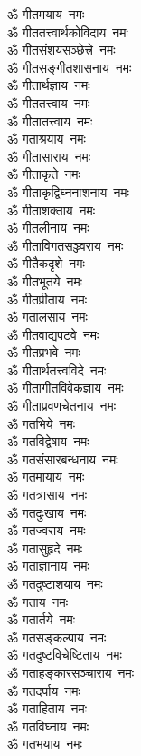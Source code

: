 \begin{multicols}{2}
\begin{flushleft}
ॐ गीतमयाय~नमः\\
ॐ गीततत्त्वार्थकोविदाय~नमः\\
ॐ गीतसंशयसञ्छेत्त्रे~नमः\\
ॐ गीतसङ्गीतशासनाय~नमः\\
ॐ गीतार्थज्ञाय~नमः\\
ॐ गीततत्त्वाय~नमः\\
ॐ गीतातत्त्वाय~नमः\hfill{}\\
ॐ गताश्रयाय~नमः\\
ॐ गीतासाराय~नमः\\
ॐ गीताकृते~नमः\\
ॐ गीताकृद्विघ्ननाशनाय~नमः\\
ॐ गीताशक्ताय~नमः\\
ॐ गीतलीनाय~नमः\\
ॐ गीताविगतसञ्ज्वराय~नमः\\
ॐ गीतैकदृशे~नमः\\
ॐ गीतभूतये~नमः\\
ॐ गीतप्रीताय~नमः\hfill{}\\
ॐ गतालसाय~नमः\\
ॐ गीतवाद्यपटवे~नमः\\
ॐ गीतप्रभवे~नमः\\
ॐ गीतार्थतत्त्वविदे~नमः\\
ॐ गीतागीतविवेकज्ञाय~नमः\\
ॐ गीताप्रवणचेतनाय~नमः\\
ॐ गतभिये~नमः\\
ॐ गतविद्वेषाय~नमः\\
ॐ गतसंसारबन्धनाय~नमः\\
ॐ गतमायाय~नमः\hfill{}\\
ॐ गतत्रासाय~नमः\\
ॐ गतदुःखाय~नमः\\
ॐ गतज्वराय~नमः\\
ॐ गतासुहृदे~नमः\\
ॐ गताज्ञानाय~नमः\\
ॐ गतदुष्टाशयाय~नमः\\
ॐ गताय~नमः\\
ॐ गतार्तये~नमः\\
ॐ गतसङ्कल्पाय~नमः\\
ॐ गतदुष्टविचेष्टिताय~नमः\hfill{}\\
ॐ गताहङ्कारसञ्चाराय~नमः\\
ॐ गतदर्पाय~नमः\\
ॐ गताहिताय~नमः\\
ॐ गतविघ्नाय~नमः\\
ॐ गतभयाय~नमः\\

\end{flushleft}
\end{multicols}
